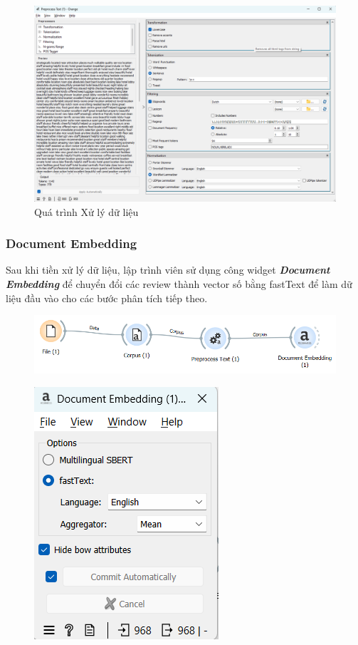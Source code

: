 \begin{figure}[H]
    \centering
    \includegraphics[width=1\linewidth]{Figures/10.6.png}
    \caption{Quá trình Xử lý dữ liệu}
\end{figure}

\subsubsection{Document Embedding}
Sau khi tiền xử lý dữ liệu, lập trình viên sử dụng công widget \textbf{\textit{Document Embedding}} để chuyển đổi các review thành vector số bằng fastText để làm dữ liệu đầu vào cho các bước phân tích tiếp theo.

\begin{figure}[H]
    \centering
    \includegraphics[width=0.5\linewidth]{Figures/10.7.png}
\end{figure}

\begin{figure}[H]
    \centering
    \includegraphics[width=0.5\linewidth]{Figures/10.8.png}
\end{figure}


